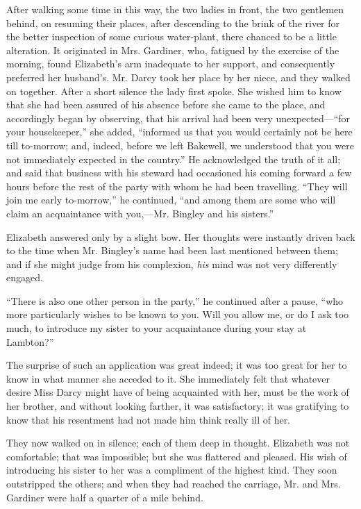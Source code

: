 \documentclass[12pt,openright]{book}
\begin{document}
After walking some time in this way, the two ladies in front, the two gentlemen behind, on resuming their places, after descending to the brink of the river for the better inspection of some curious water-plant, there chanced to be a little alteration. It originated in Mrs. Gardiner, who, fatigued by the exercise of the morning, found Elizabeth’s arm inadequate to her support, and consequently preferred her husband’s. Mr. Darcy took her place by her niece, and they walked on together. After a short silence the lady first spoke. She wished him to know that she had been assured of his absence before she came to the place, and accordingly began by observing, that his arrival had been very unexpected—“for your housekeeper,” she added, “informed us that you would certainly not be here till to-morrow; and, indeed, before we left Bakewell, we understood that you were not immediately expected in the country.” He acknowledged the truth of it all; and said that business with his steward had occasioned his coming forward a few hours before the rest of the party with whom he had been travelling. “They will join me early to-morrow,” he continued, “and among them are some who will claim an acquaintance with you,—Mr. Bingley and his sisters.”

Elizabeth answered only by a slight bow. Her thoughts were instantly driven back to the time when Mr. Bingley’s name had been last mentioned between them; and if she might judge from his complexion, \textit{his} mind was not very differently engaged.

“There is also one other person in the party,” he continued after a pause, “who more particularly wishes to be known to you. Will you allow me, or do I ask too much, to introduce my sister to your acquaintance during your stay at Lambton?”

The surprise of such an application was great indeed; it was too great for her to know in what manner she acceded to it. She immediately felt that whatever desire Miss Darcy might have of being acquainted with her, must be the work of her brother, and without looking farther, it was satisfactory; it was gratifying to know that his resentment had not made him think really ill of her.

They now walked on in silence; each of them deep in thought. Elizabeth was not comfortable; that was impossible; but she was flattered and pleased. His wish of introducing his sister to her was a compliment of the highest kind. They soon outstripped the others; and when they had reached the carriage, Mr. and Mrs. Gardiner were half a quarter of a mile behind.
\end{document}
